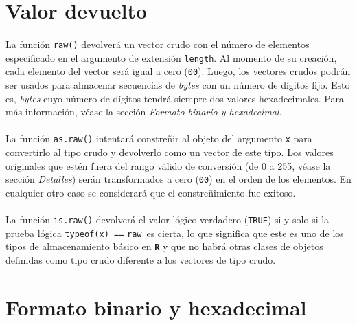 \documentclass{article}[letter, 12pt]
\def\code#1{\texttt{#1}}
\def\codename#1{\textbf{\texttt{\color{gray}#1}}}
\begin{document}
\section{\color{gray}Valor devuelto}

\paragraph{}La función \code{raw()} devolverá un vector crudo con el número de elementos especificado en el argumento de extensión \code{length}. Al momento de su creación, cada elemento del vector será igual a cero (\code{00}). Luego, los vectores crudos podrán ser usados para almacenar secuencias de \textit{bytes} con un número de dígitos fijo. Esto es, \textit{bytes} cuyo número de dígitos tendrá siempre dos valores hexadecimales. Para más información, véase la sección \textit{Formato binario y hexadecimal}.\par

\paragraph{}La función \code{as.raw()} intentará constreñir al objeto del argumento \code{x} para convertirlo al tipo crudo y devolverlo como un vector de este tipo. Los valores originales que estén fuera del rango válido de conversión (de 0 a 255, véase la sección \textit{Detalles}) serán transformados a cero (\code{00}) en el orden de los elementos. En cualquier otro caso se considerará que el constreñimiento fue exitoso.\par

\paragraph{}La función \code{is.raw()} devolverá el valor lógico verdadero (\code{TRUE}) si y solo si la prueba lógica \code{typeof(x) ==} \textquotedbl\code{raw}\textquotedbl\  es cierta, lo que significa que este es uno de los \href{run:/typeof.pdf}{tipos de almacenamiento} básico en \codename{R} y que no habrá otras clases de objetos definidas como tipo crudo diferente a los vectores de tipo crudo.\par

\section{\color{gray}Formato binario y hexadecimal}
\end{document}
